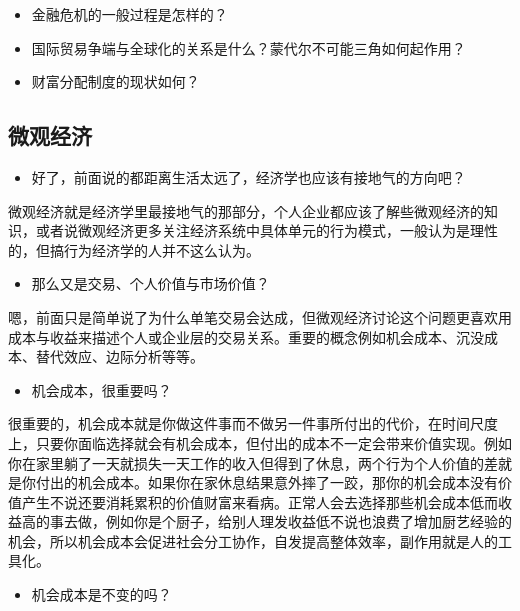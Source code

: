 \documentclass[
  letterpaper,
  DIV=11,
  numbers=noendperiod]{scrreprt}
\providecommand{\tightlist}{%
  \setlength{\itemsep}{0pt}\setlength{\parskip}{0pt}}\usepackage{longtable,booktabs,array}
\begin{document}
\begin{itemize}
\tightlist
\item
  金融危机的一般过程是怎样的？
\item
  国际贸易争端与全球化的关系是什么？蒙代尔不可能三角如何起作用？
\item
  财富分配制度的现状如何？
\end{itemize}

\subsection{微观经济}\label{ux5faeux89c2ux7ecfux6d4e}

\begin{itemize}
\tightlist
\item
  好了，前面说的都距离生活太远了，经济学也应该有接地气的方向吧？
\end{itemize}

微观经济就是经济学里最接地气的那部分，个人企业都应该了解些微观经济的知识，或者说微观经济更多关注经济系统中具体单元的行为模式，一般认为是理性的，但搞行为经济学的人并不这么认为。

\begin{itemize}
\tightlist
\item
  那么又是交易、个人价值与市场价值？
\end{itemize}

嗯，前面只是简单说了为什么单笔交易会达成，但微观经济讨论这个问题更喜欢用成本与收益来描述个人或企业层的交易关系。重要的概念例如机会成本、沉没成本、替代效应、边际分析等等。

\begin{itemize}
\tightlist
\item
  机会成本，很重要吗？
\end{itemize}

很重要的，机会成本就是你做这件事而不做另一件事所付出的代价，在时间尺度上，只要你面临选择就会有机会成本，但付出的成本不一定会带来价值实现。例如你在家里躺了一天就损失一天工作的收入但得到了休息，两个行为个人价值的差就是你付出的机会成本。如果你在家休息结果意外摔了一跤，那你的机会成本没有价值产生不说还要消耗累积的价值财富来看病。正常人会去选择那些机会成本低而收益高的事去做，例如你是个厨子，给别人理发收益低不说也浪费了增加厨艺经验的机会，所以机会成本会促进社会分工协作，自发提高整体效率，副作用就是人的工具化。

\begin{itemize}
\tightlist
\item
  机会成本是不变的吗？
\end{itemize}
\end{document}
